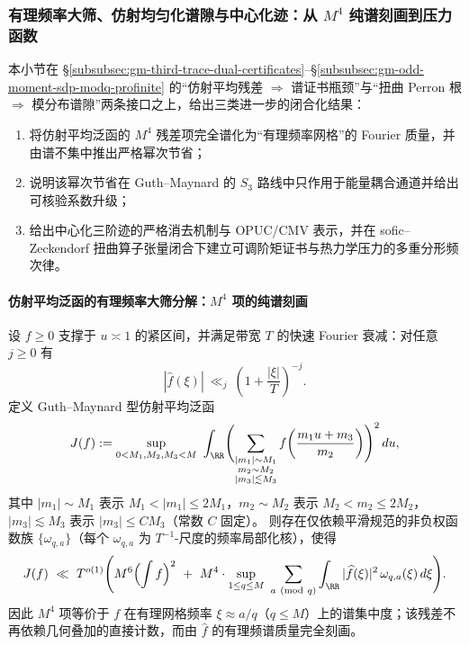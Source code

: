 \subsubsection{有理频率大筛、仿射均匀化谱隙与中心化迹：从 \texorpdfstring{$M^4$}{M4} 纯谱刻画到压力函数}\label{subsubsec:gm-rational-sieve-affine-centered-opuc-multifractal}
本小节在 \S\ref{subsubsec:gm-third-trace-dual-certificates}--\S\ref{subsubsec:gm-odd-moment-sdp-modq-profinite} 的“仿射平均残差 \(\Rightarrow\) 谱证书瓶颈”与“扭曲 Perron 根 \(\Rightarrow\) 模分布谱隙”两条接口之上，给出三类进一步的闭合化结果：
\begin{enumerate}
  \item 将仿射平均泛函的 \(M^4\) 残差项完全谱化为“有理频率网格”的 Fourier 质量，并由谱不集中推出严格幂次节省；
  \item 说明该幂次节省在 Guth--Maynard 的 \(S_3\) 路线中只作用于能量耦合通道并给出可核验系数升级；
  \item 给出中心化三阶迹的严格消去机制与 OPUC/CMV 表示，并在 sofic--Zeckendorf 扭曲算子张量闭合下建立可调阶矩证书与热力学压力的多重分形频次律。
\end{enumerate}

\paragraph{仿射平均泛函的有理频率大筛分解：\texorpdfstring{$M^4$}{M4} 项的纯谱刻画}
\begin{theorem}\label{thm:gm-affine-rational-sieve-M4}
设 \(f\ge 0\) 支撑于 \(u\asymp 1\) 的紧区间，并满足带宽 \(T\) 的快速 Fourier 衰减：对任意 \(j\ge 0\) 有
\[
|\widehat f(\xi)|\ \ll_j\ \left(1+\frac{|\xi|}{T}\right)^{-j}.
\]
定义 Guth--Maynard 型仿射平均泛函
\[
J(f)
:=\sup_{0<M_1,M_2,M_3<M}\ \int_{\RR}
\Biggl(\sum_{\substack{|m_1|\sim M_1\\ m_2\sim M_2\\ |m_3|\lesssim M_3}}
f\!\left(\frac{m_1u+m_3}{m_2}\right)\Biggr)^2\,du,
\]
其中 \(|m_1|\sim M_1\) 表示 \(M_1<|m_1|\le 2M_1\)，\(m_2\sim M_2\) 表示 \(M_2<m_2\le 2M_2\)，\(|m_3|\lesssim M_3\) 表示 \(|m_3|\le C M_3\)（常数 \(C\) 固定）。
则存在仅依赖平滑规范的非负权函数族 \(\{\omega_{q,a}\}\)（每个 \(\omega_{q,a}\) 为 \(T^{-1}\)-尺度的频率局部化核），使得
\begin{equation}\label{eq:gm-affine-rational-sieve-M4}
J(f)\ \ll\ T^{o(1)}
\Biggl(
M^6\Bigl(\int f\Bigr)^2
\ +\ 
M^4\cdot \sup_{1\le q\le M}\ \sum_{a\ (\mathrm{mod}\ q)}
\int_{\RR} |\widehat f(\xi)|^2\,\omega_{q,a}(\xi)\,d\xi
\Biggr).
\end{equation}
因此 \(M^4\) 项等价于 \(f\) 在有理网格频率 \(\xi\approx a/q\)（\(q\le M\)）上的谱集中度；该残差不再依赖几何叠加的直接计数，而由 \(\widehat f\) 的有理频谱质量完全刻画。
\end{theorem}

